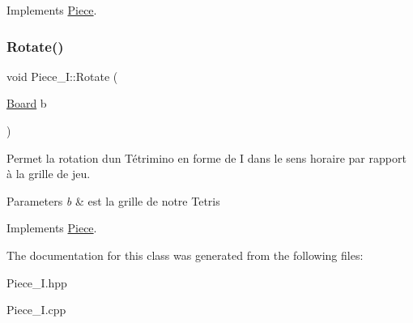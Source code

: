 Implements \hyperlink{classPiece_a56cdf7f4234fe848a3e203b693b7a862}{Piece}.

\mbox{\label{classPiece__I_ab7983a575f6d5d41cbf846b6240a9b43}} 
\subsubsection{\texorpdfstring{Rotate()}{Rotate()}}
{\footnotesize\ttfamily void Piece\+\_\+\+I\+::\+Rotate (\begin{DoxyParamCaption}\item[{\hyperlink{classBoard}{Board}}]{b }\end{DoxyParamCaption})\hspace{0.3cm}{\ttfamily [virtual]}}



Permet la rotation d\textquotesingle{}un Tétrimino en forme de I dans le sens horaire par rapport à la grille de jeu. 


\begin{DoxyParams}{Parameters}
{\em b} & est la grille de notre Tetris \\
\hline
\end{DoxyParams}


Implements \hyperlink{classPiece_a078f3cc6281cb8f60af3ae2266c651ba}{Piece}.



The documentation for this class was generated from the following files\+:\begin{DoxyCompactItemize}
\item 
Piece\+\_\+\+I.\+hpp\item 
Piece\+\_\+\+I.\+cpp\end{DoxyCompactItemize}
